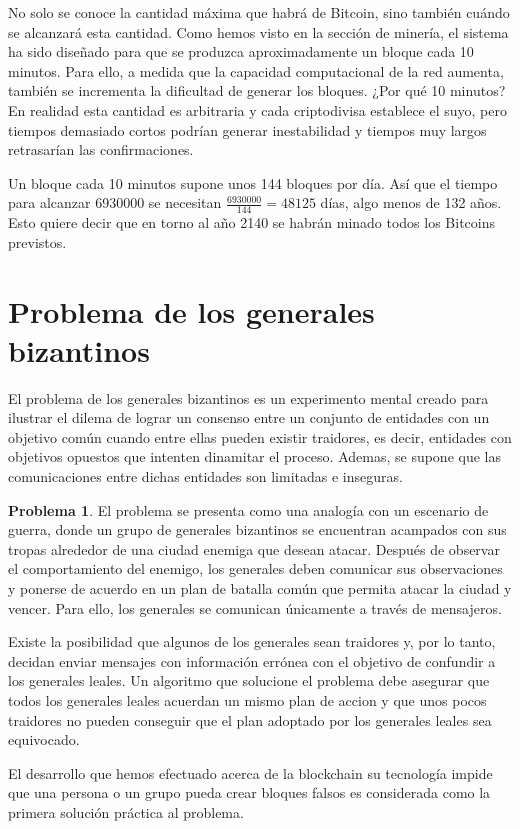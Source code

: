 \documentclass[twoside]{article}
\theoremstyle{definition}
\newtheorem{problem}[teorema]{Problema}
\begin{document}
No solo se conoce la cantidad máxima que habrá de Bitcoin, sino también cuándo se alcanzará esta cantidad. Como hemos visto en la sección de minería, el sistema ha sido diseñado para que se produzca aproximadamente un bloque cada 10 minutos. Para ello, a medida que la capacidad computacional de la red aumenta, también se incrementa la dificultad de generar los bloques. ¿Por qué 10 minutos? En realidad esta cantidad es arbitraria y cada criptodivisa establece el suyo, pero tiempos demasiado cortos podrían generar inestabilidad y tiempos muy largos retrasarían las confirmaciones. 

Un bloque cada 10 minutos supone unos 144 bloques por día. Así que el tiempo para alcanzar 6930000 se necesitan $\frac{6930000}{144} = 48125$ días, algo menos de 132 años. Esto quiere decir que en torno al año 2140 se habrán minado todos los Bitcoins previstos.





\vspace{5cm}

\newpage
\section{Problema de los generales bizantinos}
El problema de los generales bizantinos es un experimento mental creado para ilustrar el dilema de lograr un consenso entre un conjunto de entidades con un objetivo común cuando entre ellas pueden existir traidores, es decir, entidades con objetivos opuestos que intenten dinamitar el proceso. Ademas, se supone que las comunicaciones entre dichas entidades son limitadas e inseguras. 
\begin{problem}
El problema se presenta como una analogía con un escenario de guerra, donde un grupo de generales bizantinos se encuentran acampados con sus tropas alrededor de una ciudad enemiga que desean atacar. Después de observar el comportamiento del enemigo, los generales deben comunicar sus observaciones y ponerse de acuerdo en un plan de batalla común que permita atacar la ciudad y vencer. Para ello, los generales se comunican únicamente a través de mensajeros. 

Existe la posibilidad que algunos de los generales sean traidores y, por lo tanto, decidan enviar mensajes con información errónea con el objetivo de confundir a los generales leales. Un algoritmo que solucione el problema debe asegurar que todos los generales leales acuerdan un mismo plan de accion y que unos pocos traidores no pueden conseguir que el plan adoptado por los generales leales sea equivocado.
\end{problem}
El desarrollo que hemos efectuado acerca de la blockchain su tecnología impide que una persona o un grupo pueda crear bloques falsos es considerada como la primera solución práctica al problema. 
\end{document}
